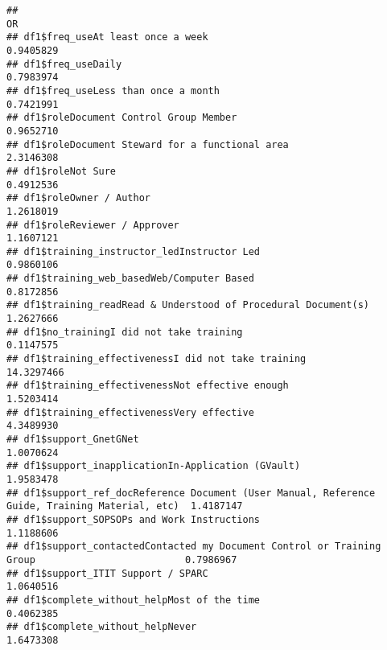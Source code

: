 \documentclass[
]{article}
\begin{document}
\begin{verbatim}
##                                                                                                      OR
## df1$freq_useAt least once a week                                                              0.9405829
## df1$freq_useDaily                                                                             0.7983974
## df1$freq_useLess than once a month                                                            0.7421991
## df1$roleDocument Control Group Member                                                         0.9652710
## df1$roleDocument Steward for a functional area                                                2.3146308
## df1$roleNot Sure                                                                              0.4912536
## df1$roleOwner / Author                                                                        1.2618019
## df1$roleReviewer / Approver                                                                   1.1607121
## df1$training_instructor_ledInstructor Led                                                     0.9860106
## df1$training_web_basedWeb/Computer Based                                                      0.8172856
## df1$training_readRead & Understood of Procedural Document(s)                                  1.2627666
## df1$no_trainingI did not take training                                                        0.1147575
## df1$training_effectivenessI did not take training                                            14.3297466
## df1$training_effectivenessNot effective enough                                                1.5203414
## df1$training_effectivenessVery effective                                                      4.3489930
## df1$support_GnetGNet                                                                          1.0070624
## df1$support_inapplicationIn-Application (GVault)                                              1.9583478
## df1$support_ref_docReference Document (User Manual, Reference Guide, Training Material, etc)  1.4187147
## df1$support_SOPSOPs and Work Instructions                                                     1.1188606
## df1$support_contactedContacted my Document Control or Training Group                          0.7986967
## df1$support_ITIT Support / SPARC                                                              1.0640516
## df1$complete_without_helpMost of the time                                                     0.4062385
## df1$complete_without_helpNever                                                                1.6473308

\end{verbatim}
\end{document}
